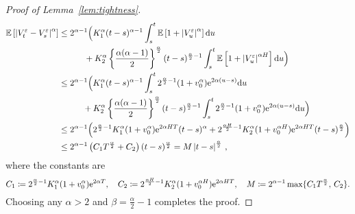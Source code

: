 \begin{proof}[Proof of Lemma~\ref{lem:tightness}]
\begin{align*}
\mathbb{E}\left[\left\vert V_t^\varepsilon - V_s^\varepsilon\right\vert^\alpha\right] 
&\leq 2^{\alpha-1}\Big(K_1^\alpha(t-s)^{\alpha-1}\int_s^t \mathbb{E}\left[ 1 + \left| V_u^\varepsilon\right|^\alpha \right]\mathrm{d} u \\ 
& \quad \quad \quad + K_2^\alpha \left\{\frac{\alpha(\alpha-1)}{2}\right\}^{\frac{\alpha}{2}} (t-s)^{\frac{\alpha}{2}-1} \int_s^t \mathbb{E}\left[1 +  \left| V_u^\varepsilon\right|^{\alpha H} \right] \mathrm{d} u\Big)\\
&\leq 2^{\alpha-1}\Big(K_1^\alpha(t-s)^{\alpha-1}\int_s^t 2^{\frac{\alpha}{2}-1}(1 + v_0^\alpha)\mathrm{e}^{2\alpha(u-s)} \mathrm{d} u \\ & ~\quad \quad \:\; + K_2^\alpha \left\{\frac{\alpha(\alpha-1)}{2}\right\}^{\frac{\alpha}{2}} (t-s)^{\frac{\alpha}{2}-1} \int_s^t 2^{\frac{\alpha}{2}-1}(1 + v_0^\alpha)\mathrm{e}^{2\alpha(u-s)} \mathrm{d} u\Big)\\
&\leq 2^{\alpha-1} \Big(2^{\frac{\alpha}{2}-1} K_1^{\alpha} (1+v_0^\alpha)\mathrm{e}^{2\alpha H T} (t-s)^\alpha +  2^{\frac{\alpha H}{2}-1} K_2^{\alpha} (1+v_0^{\alpha H})\mathrm{e}^{2\alpha H T} (t-s)^{\frac{\alpha}{2}} \Big) \\
&\leq 2^{\alpha-1}\left(C_1 T^{\frac{\alpha}{2}} + C_2\right)(t-s)^{\frac{\alpha}{2}}
= M \left\vert t - s\right\vert^{\frac{\alpha}{2}}\,,
\end{align*}
where the constants are 
$$
C_1\coloneqq 2^{\frac{\alpha}{2}-1} K_1^{\alpha} (1+v_0^\alpha)\mathrm{e}^{2\alpha T},
\quad
C_2\coloneqq 2^{\frac{\alpha H}{2}-1} K_2^{\alpha} (1+v_0^{\alpha H})\mathrm{e}^{2\alpha H T},
\quad
M\coloneqq 2^{\alpha-1}\max\{C_1 T^{\frac{\alpha}{2}}, \, C_2\}.
$$
Choosing any $\alpha > 2$ and $\beta = \frac{\alpha}{2}-1$ completes the proof.
\end{proof}

